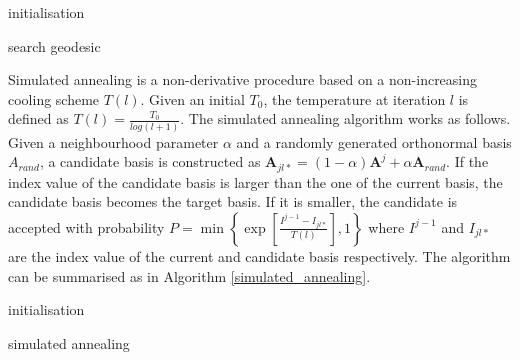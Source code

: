 \documentclass[12pt]{article}
\begin{document}
\begin{algorithm}
\SetAlgoLined
{}
  initialisation\;
  \caption{search geodesic}
  \label{search-geodesic}
\end{algorithm}

Simulated annealing
\citep[\citet{kirkpatrick1983optimization}]{bertsimas1993simulated} is a
non-derivative procedure based on a non-increasing cooling scheme
\(T(l)\). Given an initial \(T_0\), the temperature at iteration \(l\)
is defined as \(T(l) = \frac{T_0}{log(l + 1)}\). The simulated annealing
algorithm works as follows. Given a neighbourhood parameter \(\alpha\)
and a randomly generated orthonormal basis \(A_{rand}\), a candidate
basis is constructed as
\(\mathbf{A}_{jl*} = (1 - \alpha)\mathbf{A}^{j} + \alpha \mathbf{A}_{rand}\).
If the index value of the candidate basis is larger than the one of the
current basis, the candidate basis becomes the target basis. If it is
smaller, the candidate is accepted with probability
\(P= \min\left\{\exp\left[\frac{I^{j-1} - I_{jl*}}{T(l)}\right],1\right\}\)
where \(I^{j-1}\) and \(I_{jl*}\) are the index value of the current and
candidate basis respectively. The algorithm can be summarised as in
Algorithm \ref{simulated_annealing}.

\begin{algorithm}
\SetAlgoLined
{}
  initialisation\;
  \caption{simulated annealing}
  \label{simulated_annealing}
\end{algorithm}
\end{document}

